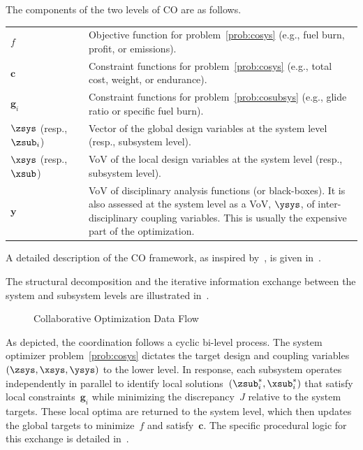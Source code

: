 The components of the two levels of CO are as follows.

\begin{center}
  \begin{tabularx}{\textwidth}{@{}l @{\quad:\quad} X@{}}
    \(f\) & Objective function for problem~\eqref{prob:cosys} (e.g., fuel burn, profit, or emissions).\\

    \(\bm{c}\) & Constraint functions for problem~\eqref{prob:cosys} (e.g., total cost, weight, or endurance).\\

    \(\bm{g}_i\) & Constraint functions for problem~\eqref{prob:cosubsys} (e.g., glide ratio or specific fuel burn).\\

    \(\zsys\) (resp.,~\(\zsub_i\)) & Vector of the global design variables at the system level (resp., subsystem level).\\

    \(\xsys\) (resp.,~\(\xsub\)) & VoV of the local design variables at the system level (resp., subsystem level).\\

    \(\bm{y}\) & VoV of disciplinary analysis functions (or black-boxes). It is also assessed at the system level as a VoV, \(\ysys\), of inter-disciplinary coupling variables. This is usually the expensive part of the optimization.
  \end{tabularx}
\end{center}

A detailed description of the CO framework, as inspired by~\cite[Algorithm 3]{martins2013}, is given in~.



The structural decomposition and the iterative information exchange between the system and subsystem levels are illustrated in~.

\begin{figure}[H]
  \centering
  \resizebox{.8\textwidth}{!}{%
    
  }%
  \caption{Collaborative Optimization Data Flow}\label{fig:codiag}
\end{figure}

As depicted, the coordination follows a cyclic bi-level process. The system optimizer problem~\eqref{prob:cosys} dictates the target design and coupling variables~\((\zsys, \xsys, \ysys)\) to the lower level. In response, each subsystem operates independently in parallel to identify local solutions~\((\zsub_i^*, \xsub_i^*)\) that satisfy local constraints~\(\bm{g}_i\) while minimizing the discrepancy~\(J\) relative to the system targets. These local optima are returned to the system level, which then updates the global targets to minimize~\(f\) and satisfy~\(\bm{c}\). The specific procedural logic for this exchange is detailed in~.

